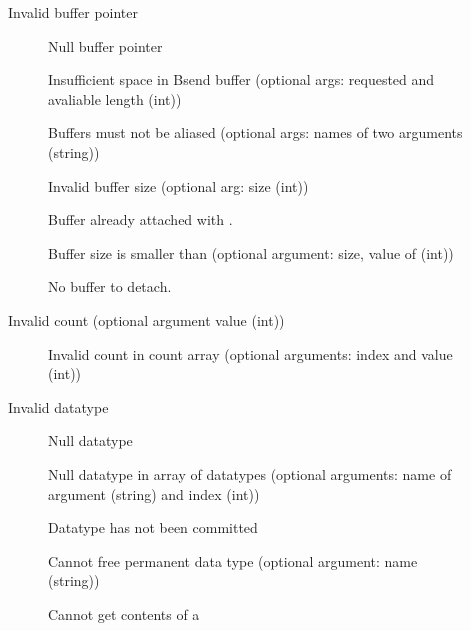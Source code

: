 \begin{description}
\item[]Invalid buffer pointer
    \begin{description}
    \item[]Null buffer pointer
    \item[]Insufficient space in Bsend
      buffer (optional args: requested and avaliable length (int))
    \item[]Buffers must not be aliased
      (optional args: names of two arguments (string))
    \item[]Invalid buffer size (optional arg:
      size (int))
    \item[]Buffer already attached with
      . 
    \item[]Buffer size is smaller than
       (optional argument: size, value of
       (int)) 
    \item[]No buffer to detach.
    \end{description}
\item[]Invalid count (optional argument value (int))
    \begin{description}
    \item[]Invalid count in count array
      (optional arguments: index and value (int))
    \end{description}
\item[]Invalid datatype
    \begin{description}
    \item[]Null datatype
    \item[]Null datatype in array of
      datatypes (optional arguments: name of argument (string) and index (int))
    \item[]Datatype has not been
      committed 
    \item[]Cannot free permanent data type
      (optional argument: name (string))
    \item[]Cannot get contents of a

\end{description}
\end{description}
